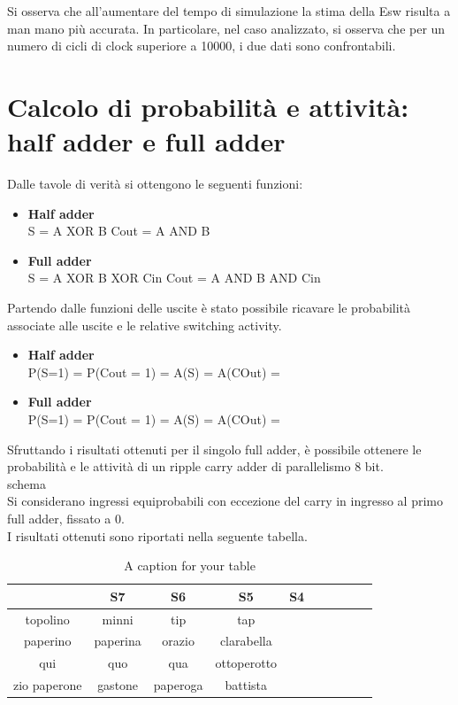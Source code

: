 Si osserva che all'aumentare del tempo di simulazione la stima della Esw risulta a man mano più accurata. In particolare, nel caso analizzato, si osserva che per un numero di cicli di clock superiore a 10000, i due dati sono confrontabili.


\section{Calcolo di probabilit\`a e attivit\`a: half adder e full adder}

Dalle tavole di verità si ottengono le seguenti funzioni:

\begin{itemize}
\item \textbf{Half adder} \\
S = A XOR B
Cout = A AND B
\item \textbf{Full adder} \\
S = A XOR B XOR Cin
Cout = A AND B AND Cin
\end{itemize} 

Partendo dalle funzioni delle uscite è stato possibile ricavare le probabilità associate alle uscite e le relative switching activity.

\begin{itemize}
\item \textbf{Half adder} \\
P(S=1) = 
P(Cout = 1) =
A(S) =
A(COut) =
\item \textbf{Full adder} \\
P(S=1) = 
P(Cout = 1) =
A(S) =
A(COut) =
\end{itemize} 

Sfruttando i risultati ottenuti per il singolo full adder, è possibile ottenere le probabilità e le attività di un ripple carry adder di parallelismo 8 bit.
\\
schema
\\
Si considerano ingressi equiprobabili con eccezione del carry in ingresso al primo full adder, fissato a 0.\\
I risultati ottenuti sono riportati nella seguente tabella.

\begin{table}
\begin{center}
\begin{tabular}{|c|c|c|c|c|c|c|c|c|c|}
\hline
 & S7 & S6 & S5 & S4 \\
\hline
topolino & minni & tip & tap \\
\hline
\hline
paperino & paperina & orazio & clarabella \\
\hline
qui & quo & qua & ottoperotto \\
zio paperone & gastone & paperoga & battista \\ 
\hline 
\end{tabular}
\end{center}
\caption{A caption for your table}
\label{A-lable-for-your-table}
\end{table}

